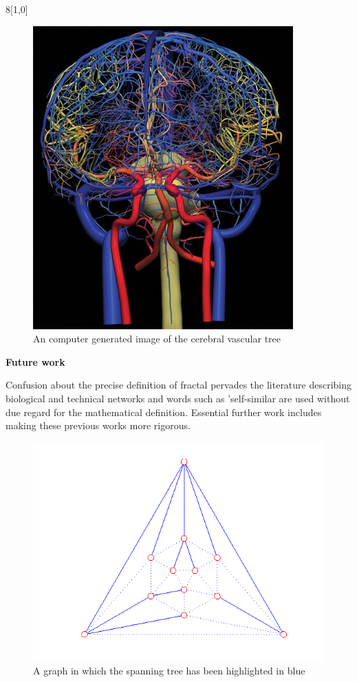 \documentclass[a1,portrait]{a0poster}
\def\Head#1{{\noindent\raggedright{\large\textsf{\textbf{#1}}}\par}}
\begin{document}
\begin{textblock}{8}[1,0]
\begin{figure}
\centering
\includegraphics[scale=0.3]{veins.jpg}
\caption{An computer generated image of the cerebral vascular tree}
\label{fig:joetwat}
\end{figure}


\Head{Future work}
Confusion about the precise definition of fractal pervades the literature describing biological and technical networks and words such as 'self-similar are used without due regard for the mathematical definition.  Essential further work includes making these previous works more rigorous. 
\begin{figure}
\centering
\includegraphics[scale=0.52]{spa.png}
\caption{A graph in which the spanning tree has been highlighted in blue}
\label{fig:joe2}
\end{figure}

\end{textblock}
\end{document}
